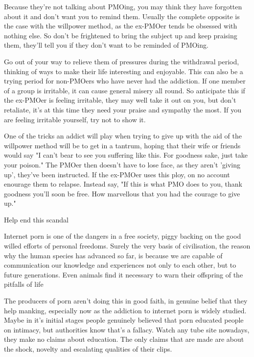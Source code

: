 Because they're not talking about PMOing, you may think they have forgotten about it and don't want you to remind them. Usually the complete opposite is the case with the willpower method, as the ex-PMOer tends be obsessed with nothing else. So don't be frightened to bring the subject up and keep praising them, they'll tell you if they don't want to be reminded of PMOing.

Go out of your way to relieve them of pressures during the withdrawal period, thinking of ways to make their life interesting and enjoyable. This can also be a trying period for non-PMOers who have never had the addiction. If one member of a group is irritable, it can cause general misery all round. So anticipate this if the ex-PMOer is feeling irritable, they may well take it out on you, but don't retaliate, it's at this time they need your praise and sympathy the most. If you are feeling irritable yourself, try not to show it.

One of the tricks an addict will play when trying to give up with the aid of the willpower method will be to get in a tantrum, hoping that their wife or friends would say "I can't bear to see you suffering like this. For goodness sake, just take your poison." The PMOer then doesn't have to lose face, as they aren't 'giving up', they've been instructed. If the ex-PMOer uses this ploy, on no account enourage them to relapse. Instead say, "If this is what PMO does to you, thank goodness you'll soon be free. How marvellous that you had the courage to give up."

Help end this scandal

Internet porn is one of the dangers in a free society, piggy backing on the good willed efforts of personal freedoms. Surely the very basis of civilisation, the reason why the human species has advanced so far, is because we are capable of communication our knowledge and experiences not only to each other, but to future generations. Even animals find it necessary to warn their offspring of the pitfalls of life

The producers of porn aren't doing this in good faith, in genuine belief that they help manking, especially now as the addiction to internet porn is widely studied. Maybe in it's initial stages people genuinely believed that porn educated people on intimacy, but authorities know that's a fallacy. Watch any tube site nowadays, they make no claims about education. The only claims that are made are about the shock, novelty and escalating qualities of their clips.

